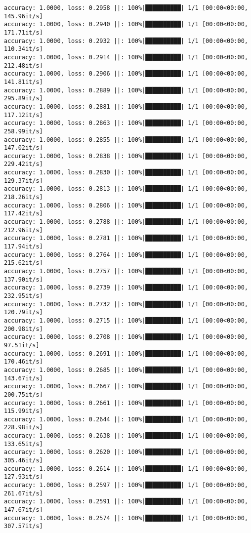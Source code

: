 \documentclass[
]{article}
\begin{document}
\begin{verbatim}
accuracy: 1.0000, loss: 0.2958 ||: 100%|██████████| 1/1 [00:00<00:00, 145.96it/s]
accuracy: 1.0000, loss: 0.2940 ||: 100%|██████████| 1/1 [00:00<00:00, 171.71it/s]
accuracy: 1.0000, loss: 0.2932 ||: 100%|██████████| 1/1 [00:00<00:00, 110.34it/s]
accuracy: 1.0000, loss: 0.2914 ||: 100%|██████████| 1/1 [00:00<00:00, 212.48it/s]
accuracy: 1.0000, loss: 0.2906 ||: 100%|██████████| 1/1 [00:00<00:00, 141.81it/s]
accuracy: 1.0000, loss: 0.2889 ||: 100%|██████████| 1/1 [00:00<00:00, 295.89it/s]
accuracy: 1.0000, loss: 0.2881 ||: 100%|██████████| 1/1 [00:00<00:00, 117.12it/s]
accuracy: 1.0000, loss: 0.2863 ||: 100%|██████████| 1/1 [00:00<00:00, 258.99it/s]
accuracy: 1.0000, loss: 0.2855 ||: 100%|██████████| 1/1 [00:00<00:00, 147.02it/s]
accuracy: 1.0000, loss: 0.2838 ||: 100%|██████████| 1/1 [00:00<00:00, 229.42it/s]
accuracy: 1.0000, loss: 0.2830 ||: 100%|██████████| 1/1 [00:00<00:00, 129.37it/s]
accuracy: 1.0000, loss: 0.2813 ||: 100%|██████████| 1/1 [00:00<00:00, 218.26it/s]
accuracy: 1.0000, loss: 0.2806 ||: 100%|██████████| 1/1 [00:00<00:00, 117.42it/s]
accuracy: 1.0000, loss: 0.2788 ||: 100%|██████████| 1/1 [00:00<00:00, 212.96it/s]
accuracy: 1.0000, loss: 0.2781 ||: 100%|██████████| 1/1 [00:00<00:00, 117.94it/s]
accuracy: 1.0000, loss: 0.2764 ||: 100%|██████████| 1/1 [00:00<00:00, 215.62it/s]
accuracy: 1.0000, loss: 0.2757 ||: 100%|██████████| 1/1 [00:00<00:00, 137.90it/s]
accuracy: 1.0000, loss: 0.2739 ||: 100%|██████████| 1/1 [00:00<00:00, 232.95it/s]
accuracy: 1.0000, loss: 0.2732 ||: 100%|██████████| 1/1 [00:00<00:00, 120.79it/s]
accuracy: 1.0000, loss: 0.2715 ||: 100%|██████████| 1/1 [00:00<00:00, 200.98it/s]
accuracy: 1.0000, loss: 0.2708 ||: 100%|██████████| 1/1 [00:00<00:00, 97.51it/s]
accuracy: 1.0000, loss: 0.2691 ||: 100%|██████████| 1/1 [00:00<00:00, 170.46it/s]
accuracy: 1.0000, loss: 0.2685 ||: 100%|██████████| 1/1 [00:00<00:00, 143.67it/s]
accuracy: 1.0000, loss: 0.2667 ||: 100%|██████████| 1/1 [00:00<00:00, 200.75it/s]
accuracy: 1.0000, loss: 0.2661 ||: 100%|██████████| 1/1 [00:00<00:00, 115.99it/s]
accuracy: 1.0000, loss: 0.2644 ||: 100%|██████████| 1/1 [00:00<00:00, 228.98it/s]
accuracy: 1.0000, loss: 0.2638 ||: 100%|██████████| 1/1 [00:00<00:00, 133.65it/s]
accuracy: 1.0000, loss: 0.2620 ||: 100%|██████████| 1/1 [00:00<00:00, 305.46it/s]
accuracy: 1.0000, loss: 0.2614 ||: 100%|██████████| 1/1 [00:00<00:00, 127.93it/s]
accuracy: 1.0000, loss: 0.2597 ||: 100%|██████████| 1/1 [00:00<00:00, 261.67it/s]
accuracy: 1.0000, loss: 0.2591 ||: 100%|██████████| 1/1 [00:00<00:00, 147.67it/s]
accuracy: 1.0000, loss: 0.2574 ||: 100%|██████████| 1/1 [00:00<00:00, 307.57it/s]

\end{verbatim}
\end{document}
